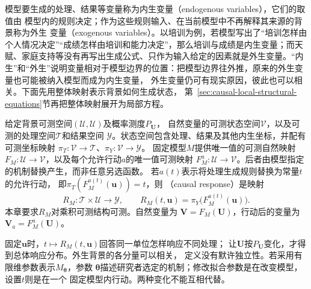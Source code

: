 模型要生成的处理、结果等变量称为内生变量（endogenous variables），它们的取值由
模型内的规则决定；作为这些规则输入、在当前模型中不再解释其来源的背景称为外生
变量（exogenous variables）。以培训为例，若模型写出了“培训怎样由个人情况决定”“成绩怎样由培训和能力决定”，那么培训与成绩是内生变量；而天赋、家庭支持等没有再写出生成公式、只作为输入给定的因素就是外生变量。“内生”和“外生”说明变量相对于模型边界的位置：把模型边界往外推，原来的外生变量也可能被纳入模型而成为内生变量，
外生变量仍可有现实原因，彼此也可以相关。下面先用整体映射表示背景如何生成状态，
第~\ref{sec:causal-local-structural-equations}节再把整体映射展开为局部方程。

\begin{definition}
  \label{def:causal-response-interface}
  给定背景可测空间\((\mathcal U,\mathscr U)\)及概率测度\(P_{\bm U}\)，
  自然变量的可测状态空间\(\mathcal V\)，以及可测的处理空间\(\mathcal T\)和结果空间
  \(\mathcal Y\)。状态空间包含处理、结果及其他内生坐标，并配有可测坐标映射
  \(\pi_T:\mathcal V\to\mathcal T\)、\(\pi_Y:\mathcal V\to\mathcal Y\)。
  固定模型\(M\)提供唯一值的可测自然映射
  \(F_M:\mathcal U\to\mathcal V\)，以及每个允许行动\(a\)的唯一值可测映射
  \(F_M^a:\mathcal U\to\mathcal V\)。后者由模型指定的机制替换产生，而非任意另选函数。
  若\(a(t)\)表示将处理生成规则替换为常量\(t\)的允许行动，
  即\(\pi_T(F_M^{a(t)}(\bm u))=t\)，则
  （causal response）是映射
  \begin{equation}
    R_M:\mathcal T\times\mathcal U\longrightarrow\mathcal Y,
    \qquad
    R_M(t,\bm u)=\pi_Y\bigl(F_M^{a(t)}(\bm u)\bigr).
    \label{eq:causal-response-interface}
  \end{equation}
  本章要求\(R_M\)对乘积可测结构可测。自然变量为
  \(\bm V=F_M(\bm U)\)，行动后的变量为\(\bm V_a=F_M^a(\bm U)\)。
\end{definition}

固定\(\bm u\)时，\(t\mapsto R_M(t,\bm u)\)回答同一单位怎样响应不同处理；
让\(\bm U\)按\(P_{\bm U}\)变化，才得到总体响应分布。外生背景的各分量可以相关，
定义没有默许独立性。若采用有限维参数表示\(M_{\bm\theta}\)，参数
\(\bm\theta\)描述研究者选定的机制；修改拟合参数是在改变模型，设置\(t\)则是在一个
固定模型内行动。两种变化不能互相代替。

